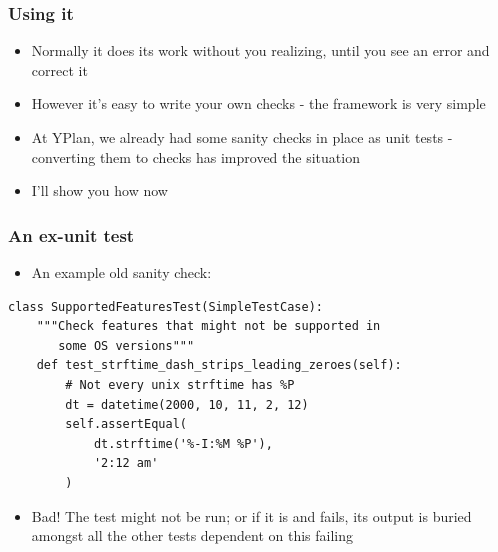 \documentclass{beamer}
\begin{document}
\begin{frame}[fragile]\frametitle{Using it}

    \begin{itemize}
        \item Normally it does its work without you realizing, until you see an error and correct it
        \item However it's easy to write your own checks - the framework is very simple
        \item At YPlan, we already had some sanity checks in place as unit tests - converting them to checks has improved the situation
        \item I'll show you how now
    \end{itemize}

\end{frame}


\begin{frame}[fragile]\frametitle{An ex-unit test}

    \begin{itemize}
        \item An example old sanity check:
    \end{itemize}

    \begin{lstlisting}
class SupportedFeaturesTest(SimpleTestCase):
    """Check features that might not be supported in
       some OS versions"""
    def test_strftime_dash_strips_leading_zeroes(self):
        # Not every unix strftime has %P
        dt = datetime(2000, 10, 11, 2, 12)
        self.assertEqual(
            dt.strftime('%-I:%M %P'),
            '2:12 am'
        )
    \end{lstlisting}

    \begin{itemize}
        \item Bad! The test might not be run; or if it is and fails, its output is buried amongst all the other tests dependent on this failing
    \end{itemize}
\end{frame}
\end{document}
